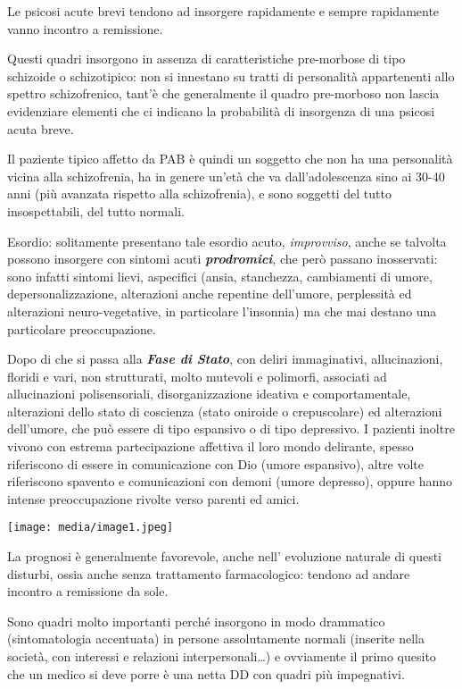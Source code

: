 \documentclass[]{article}
\begin{document}
Le psicosi acute brevi tendono ad insorgere rapidamente e sempre
rapidamente vanno incontro a remissione.

Questi quadri insorgono in assenza di caratteristiche pre-morbose di
tipo schizoide o schizotipico: non si innestano su tratti di personalità
appartenenti allo spettro schizofrenico, tant'è che generalmente il
quadro pre-morboso non lascia evidenziare elementi che ci indicano la
probabilità di insorgenza di una psicosi acuta breve.

Il paziente tipico affetto da PAB è quindi un soggetto che non ha una
personalità vicina alla schizofrenia, ha in genere un'età che va
dall'adolescenza sino ai 30-40 anni (più avanzata rispetto alla
schizofrenia), e sono soggetti del tutto insospettabili, del tutto
normali.

Esordio: solitamente presentano tale esordio acuto, \emph{improvviso},
anche se talvolta possono insorgere con sintomi acuti
\textbf{\emph{prodromici}}, che però passano inosservati: sono infatti
sintomi lievi, aspecifici (ansia, stanchezza, cambiamenti di umore,
depersonalizzazione, alterazioni anche repentine dell'umore, perplessità
ed alterazioni neuro-vegetative, in particolare l'insonnia) ma che mai
destano una particolare preoccupazione.

Dopo di che si passa alla \textbf{\emph{Fase di Stato}}, con deliri
immaginativi, allucinazioni, floridi e vari, non strutturati, molto
mutevoli e polimorfi, associati ad allucinazioni polisensoriali,
disorganizzazione ideativa e comportamentale, alterazioni dello stato di
coscienza (stato oniroide o crepuscolare) ed alterazioni dell'umore, che
può essere di tipo espansivo o di tipo depressivo. I pazienti inoltre
vivono con estrema partecipazione affettiva il loro mondo delirante,
spesso riferiscono di essere in comunicazione con Dio (umore espansivo),
altre volte riferiscono spavento e comunicazioni con demoni (umore
depresso), oppure hanno intense preoccupazione rivolte verso parenti ed
amici.

\texttt{[image: media/image1.jpeg]}

La prognosi è generalmente favorevole, anche nell' evoluzione naturale
di questi disturbi, ossia anche senza trattamento farmacologico: tendono
ad andare incontro a remissione da sole.

Sono quadri molto importanti perché insorgono in modo drammatico
(sintomatologia accentuata) in persone assolutamente normali (inserite
nella società, con interessi e relazioni interpersonali\ldots{}) e
ovviamente il primo quesito che un medico si deve porre è una netta DD
con quadri più impegnativi.
\end{document}
